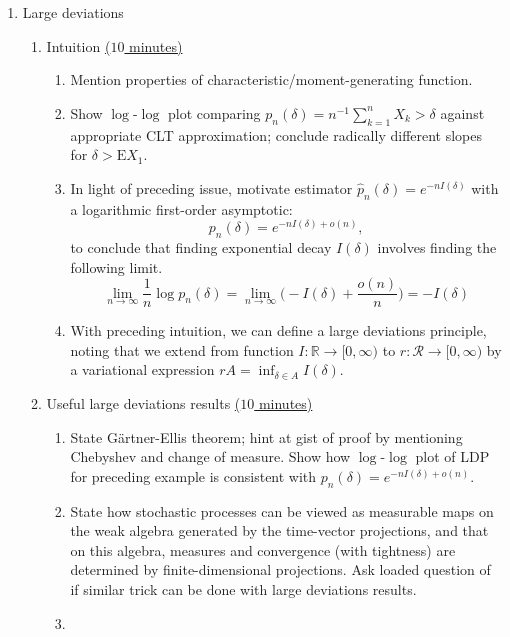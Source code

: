 \documentclass{article}
\newcommand{\bbR}{\mathbb{R}}
\newcommand{\rmE}{\mathrm{E}}
\newcommand{\calR}{\mathcal{R}}
\begin{document}
\begin{enumerate}
  \item
    Large deviations
    \begin{enumerate}
      \item
        Intuition \underline{($10$ minutes)}
        \begin{enumerate}
          \item\label{characteristic}
            Mention properties of characteristic/moment-generating function.
          \item
            Show $\log$-$\log$ plot comparing $p_n(\delta) = n^{-1}\sum_{k=1}^n X_k > \delta$ against appropriate CLT approximation; conclude radically different slopes for $\delta > \rmE X_1$.
          \item
            In light of preceding issue, motivate estimator $\hat p_n(\delta) = e^{-nI(\delta)}$ with a logarithmic first-order asymptotic:
            \[
              p_n(\delta) = e^{-nI(\delta) + o(n)},
            \]
            to conclude that finding exponential decay $I(\delta)$ involves finding the following limit.
            \[
              \lim_{n\rightarrow\infty} \frac1n\log p_n(\delta) = \lim_{n\rightarrow\infty} \Big( -I(\delta) + \frac{o(n)}{n} \Big) = -I(\delta)
            \]
          \item
            With preceding intuition, we can define a large deviations principle, noting that we extend from function $I: \bbR \rightarrow [0, \infty)$ to $r: \calR \rightarrow [0,\infty)$ by a variational expression $rA = \inf_{\delta \in A} I(\delta)$.
        \end{enumerate}
      \item
        Useful large deviations results \underline{($10$ minutes)}
        \begin{enumerate}
          \item
            State G\"artner-Ellis theorem; hint at gist of proof by mentioning Chebyshev and change of measure.
            Show how $\log$-$\log$ plot of LDP for preceding example is consistent with $p_n(\delta) = e^{-nI(\delta) + o(n)}$.
          \item\label{processes}
            State how stochastic processes can be viewed as measurable maps on the weak algebra generated by the time-vector projections, and that on this algebra, measures and convergence (with tightness) are determined by finite-dimensional projections.
            Ask loaded question of if similar trick can be done with large deviations results.
          \item

\end{enumerate}
\end{enumerate}
\end{enumerate}
\end{document}
